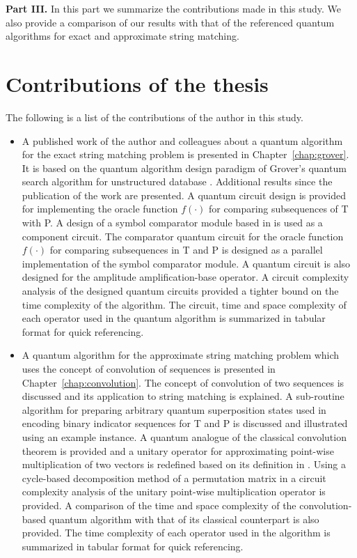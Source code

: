 \textbf{Part III.} In this part we summarize the contributions made in this study. We also provide a comparison of our results with that of the referenced quantum algorithms for exact and approximate string matching.

\section*{Contributions of the thesis}
The following is a list of the contributions of the author in this study.
\begin{itemize}

\item A published work of the author and colleagues about a quantum algorithm for the exact string matching problem \cite{Aborot2013} is presented in Chapter~\ref{chap:grover}. It is based on the quantum algorithm design paradigm of Grover's quantum search algorithm for unstructured database \cite{Grover1996}. Additional results since the publication of the work are presented. A quantum circuit design is provided for implementing the oracle function $f(\cdot)$ for comparing subsequences of T with P. A design of a symbol comparator module based in \cite{Thapliyal2010} is used as a component circuit. The comparator quantum circuit for the oracle function $f(\cdot)$ for comparing subsequences in T and P is designed as a parallel implementation of the symbol comparator module. A quantum circuit is also designed for the amplitude amplification-base operator. A circuit complexity analysis of the designed quantum circuits provided a tighter bound on the time complexity of the algorithm. The circuit, time and space complexity of each operator used in the quantum algorithm is summarized in tabular format for quick referencing.


\item A quantum algorithm for the approximate string matching problem which uses the concept of convolution of sequences is presented in Chapter~\ref{chap:convolution}. The concept of convolution of two sequences is discussed and its application to string matching is explained. A sub-routine algorithm for preparing arbitrary quantum superposition states \cite{Rosenbaum2009} used in encoding binary indicator sequences for T and P is discussed and illustrated using an example instance. A quantum analogue of the classical convolution theorem is provided and a unitary operator for approximating point-wise multiplication of two vectors is redefined based on its definition in \cite{Curtis2004}. Using a cycle-based decomposition method of a permutation matrix in \cite{Welch2014b,Welch2014c,Welch2015} a circuit complexity analysis of the unitary point-wise multiplication operator is provided. A comparison of the time and space complexity of the convolution-based quantum algorithm with that of its classical counterpart is also provided. The time complexity of each operator used in the algorithm is summarized in tabular format for quick referencing.


\end{itemize}
